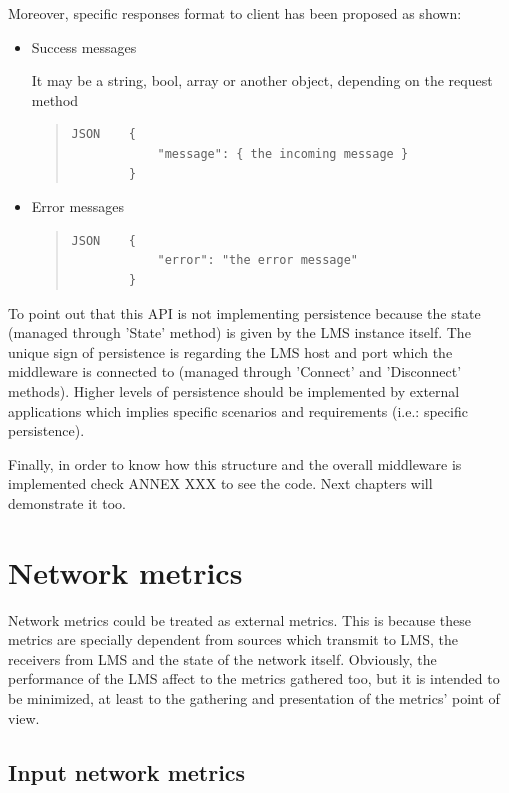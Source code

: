 Moreover, specific responses format to client has been proposed as shown:

\begin{itemize}
\item Success messages \hfill

It may be a string, bool, array or another object, depending on the request method

\begin{quote}
\begin{verbatim}
JSON    {
            "message": { the incoming message }
        }
\end{verbatim}
\end{quote}        
\item Error messages \hfill

\begin{quote}
\begin{verbatim}
JSON    {
            "error": "the error message"
        }
\end{verbatim}
\end{quote}
\end{itemize}

To point out that this API is not implementing persistence because the state (managed through 'State' method) is given by the LMS instance itself. The unique sign of persistence is regarding the LMS host and port which the middleware is connected to (managed through 'Connect' and 'Disconnect' methods). Higher levels of persistence should be implemented by external applications which implies specific scenarios and requirements (i.e.: specific persistence).

Finally, in order to know how this structure and the overall middleware is implemented check ANNEX XXX to see the code. Next chapters will demonstrate it too.

\section{Network metrics}

Network metrics could be treated as external metrics. This is because these metrics are specially dependent from sources which transmit to LMS, the receivers from LMS and the state of the network itself. Obviously, the performance of the LMS affect to the metrics gathered too, but it is intended to be minimized, at least to the gathering and presentation of the metrics' point of view.

\subsection{Input network metrics}

